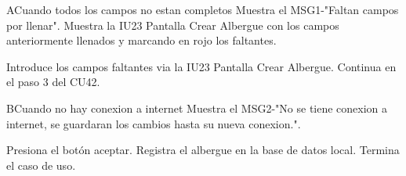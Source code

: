 \begin{UCtrayectoriaA}{A}{Cuando todos los campos no estan completos}
	\UCpaso Muestra el MSG1-"Faltan campos por llenar".
	\UCpaso Muestra la IU23 Pantalla Crear Albergue con los campos anteriormente llenados y marcando en rojo los faltantes.
	\item\UCactor Introduce los campos faltantes via la IU23 Pantalla Crear Albergue.
	\UCpaso Continua en el paso 3 del CU42.
\end{UCtrayectoriaA}

\begin{UCtrayectoriaA}{B}{Cuando no hay conexion a internet}
	\UCpaso Muestra el MSG2-"No se tiene conexion a internet, se guardaran los cambios hasta su nueva conexion.".
	\item\UCactor Presiona el botón aceptar.
	\UCpaso Registra el albergue en la base de datos local.	
	\UCpaso[] Termina el caso de uso.
\end{UCtrayectoriaA}